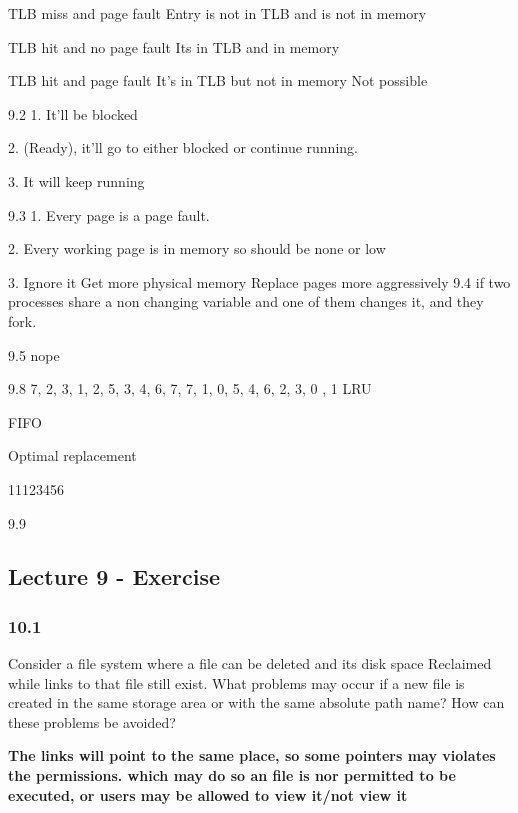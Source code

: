 \documentclass[a4paper,10pt,titlepage]{report}
\begin{document}
TLB miss and page fault
	Entry is not in TLB and is not in memory 

TLB hit and no page fault
	Its in TLB and in memory

TLB hit and page fault
	It's in TLB but not in memory
	Not possible

9.2
	1. It'll be blocked
	
	2. (Ready), it'll go to either blocked or continue running.
	
	3. It will keep running
	
9.3
	1. Every page is a page fault.
	
	2. Every working page is in memory so should be none or low
	
	3. 
		Ignore it
		Get more physical memory
		Replace pages more aggressively
9.4
	if two processes share a non changing variable and one of them changes it, and they fork.
	
	
9.5
	nope
	
9.8
	7, 2, 3, 1, 2, 5, 3, 4, 6, 7, 7, 1, 0, 5, 4, 6, 2, 3, 0 , 1
	LRU
	
	
	FIFO
		
	
	
	Optimal replacement
	
	11123456


9.9




















\newpage
\subsection{Lecture 9 - Exercise}
\subsubsection{10.1}
Consider a file system where a file can be deleted and its disk space Reclaimed while links to that file still exist. What problems may occur if a new file is created in the same storage area or with the same absolute path name? How can these problems be avoided?

\hspace{15mm} \textbf{The links will point to the same place, so some pointers may violates the permissions. which may do so an file is nor permitted to be executed, or users may be allowed to view it/not view it} \\
\end{document}
